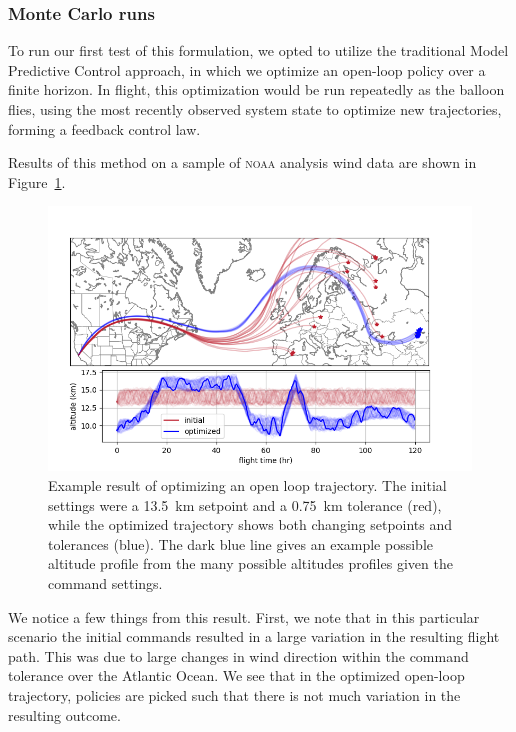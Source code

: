 \documentclass[11pt]{scrartcl} %
\begin{document}
\subsubsection{Monte Carlo runs}

To run our first test of this formulation, we opted to utilize the traditional Model Predictive Control approach, in which we optimize an open-loop policy over a finite horizon. In flight, this optimization would be run repeatedly as the balloon flies, using the most recently observed system state to optimize new trajectories, forming a feedback control law. 

Results of this method on a sample of \textsc{noaa} analysis wind data are shown in Figure~\ref{openloop}.
\begin{figure}[h]
\includegraphics[width=\linewidth]{datasheetfig.png}
\caption{Example result of optimizing an open loop trajectory. The initial settings were a 13.5~km setpoint and a 0.75~km tolerance (red), while the optimized trajectory shows both changing setpoints and tolerances (blue). The dark blue line gives an example possible altitude profile from the many possible altitudes profiles given the command settings.}
\label{openloop}
\end{figure}

We notice a few things from this result. First, we note that in this particular scenario the initial commands resulted in a large variation in the resulting flight path. This was due to large changes in wind direction within the command tolerance over the Atlantic Ocean. We see that in the optimized open-loop trajectory, policies are picked such that there is not much variation in the resulting outcome. 


\newpage
\end{document}
